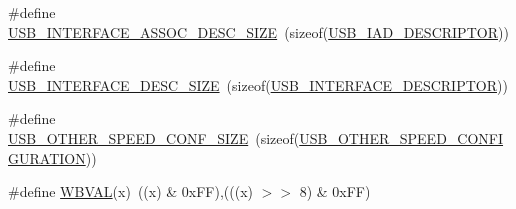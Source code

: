 \begin{DoxyCompactItemize}
\item 
\#define \hyperlink{group__USBD__Core_gae377b4fc3e66e90afb99e60fa5cc0a94}{U\+S\+B\+\_\+\+I\+N\+T\+E\+R\+F\+A\+C\+E\+\_\+\+A\+S\+S\+O\+C\+\_\+\+D\+E\+S\+C\+\_\+\+S\+I\+ZE}~(sizeof(\hyperlink{group__USBD__Core_ga6b053e842151d5c5dcdace597e45a36b}{U\+S\+B\+\_\+\+I\+A\+D\+\_\+\+D\+E\+S\+C\+R\+I\+P\+T\+OR}))
\item 
\#define \hyperlink{group__USBD__Core_gac7fd274cdd131f4c0addec7a139bc9b7}{U\+S\+B\+\_\+\+I\+N\+T\+E\+R\+F\+A\+C\+E\+\_\+\+D\+E\+S\+C\+\_\+\+S\+I\+ZE}~(sizeof(\hyperlink{group__USBD__Core_gac933513ce6cbf852d0dc998bd8fb333d}{U\+S\+B\+\_\+\+I\+N\+T\+E\+R\+F\+A\+C\+E\+\_\+\+D\+E\+S\+C\+R\+I\+P\+T\+OR}))
\item 
\#define \hyperlink{group__USBD__Core_gab7288d5e0e645952c8c156182f3baa11}{U\+S\+B\+\_\+\+O\+T\+H\+E\+R\+\_\+\+S\+P\+E\+E\+D\+\_\+\+C\+O\+N\+F\+\_\+\+S\+I\+ZE}~(sizeof(\hyperlink{group__USBD__Core_ga808d47bcf11e648d95efc88e330fabc5}{U\+S\+B\+\_\+\+O\+T\+H\+E\+R\+\_\+\+S\+P\+E\+E\+D\+\_\+\+C\+O\+N\+F\+I\+G\+U\+R\+A\+T\+I\+ON}))
\item 
\#define \hyperlink{group__USBD__Core_ga018fc058eba40cffd92be1756a5d2b40}{W\+B\+V\+AL}(x)~((x) \& 0x\+F\+F),(((x) $>$$>$ 8) \& 0x\+F\+F)
\end{DoxyCompactItemize}
